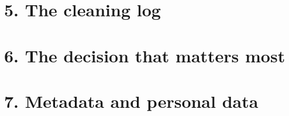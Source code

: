 \documentclass[10pt,a4paper]{article}
\begin{document}
\section*{5. The cleaning log}


\section*{6. The decision that matters most}


\section*{7. Metadata and personal data}
\end{document}
